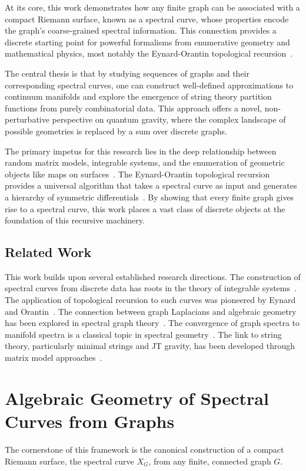 \documentclass[12pt]{article}
\theoremstyle{definition}
\begin{document}
At its core, this work demonstrates how any finite graph can be associated with a compact Riemann surface, known as a spectral curve, whose properties encode the graph's coarse-grained spectral information. This connection provides a discrete starting point for powerful formalisms from enumerative geometry and mathematical physics, most notably the Eynard-Orantin topological recursion~\cite{Eynard2007, Eynard2014}.

The central thesis is that by studying sequences of graphs and their corresponding spectral curves, one can construct well-defined approximations to continuum manifolds and explore the emergence of string theory partition functions from purely combinatorial data. This approach offers a novel, non-perturbative perspective on quantum gravity, where the complex landscape of possible geometries is replaced by a sum over discrete graphs.

The primary impetus for this research lies in the deep relationship between random matrix models, integrable systems, and the enumeration of geometric objects like maps on surfaces~\cite{DiFrancesco1995, Eynard2006}. The Eynard-Orantin topological recursion provides a universal algorithm that takes a spectral curve as input and generates a hierarchy of symmetric differentials~\cite{Eynard2007, Eynard2011}. By showing that every finite graph gives rise to a spectral curve, this work places a vast class of discrete objects at the foundation of this recursive machinery.

\subsection{Related Work}
This work builds upon several established research directions. The construction of spectral curves from discrete data has roots in the theory of integrable systems~\cite{Dubrovin1981}. The application of topological recursion to such curves was pioneered by Eynard and Orantin~\cite{Eynard2007, Eynard2014}. The connection between graph Laplacians and algebraic geometry has been explored in spectral graph theory~\cite{Chung1997}. The convergence of graph spectra to manifold spectra is a classical topic in spectral geometry~\cite{Belkin2006, Trillos2018}. The link to string theory, particularly minimal strings and JT gravity, has been developed through matrix model approaches~\cite{Saad2019, Stanford2019}.

\section{Algebraic Geometry of Spectral Curves from Graphs}
The cornerstone of this framework is the canonical construction of a compact Riemann surface, the spectral curve $X_G$, from any finite, connected graph $G$.
\end{document}
